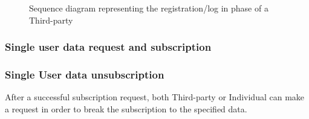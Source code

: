             \begin{figure}[H]
                \centering
                \caption{Sequence diagram representing the registration/log in phase of a Third-party}
                \label{fig:seq-diagram2}
            \end{figure}
            
            
        \subsubsection{Single user data request and subscription}
            
            
        \subsubsection{Single User data unsubscription}
            After a successful subscription request, both Third-party or Individual can make a request in order to break the subscription to the specified data.

